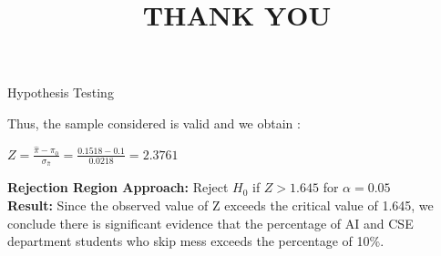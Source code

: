 \documentclass{beamer}
\begin{document}
\begin{frame}{Hypothesis Testing}
\begin{block}{}
Thus, the sample considered is valid and we obtain :
\begin{center}
$Z = \frac{\hat{\pi}-{\pi_0}}{\sigma_{\hat{\pi}}} = \frac{0.1518-0.1}{0.0218} = 2.3761$
\end{center}
\textbf{Rejection Region Approach:}
Reject $H_0$ if $Z>1.645$ for $\alpha = 0.05$\\
\textbf{Result:}
Since the observed value of Z exceeds the critical value of
1.645, we conclude there is significant evidence that the
percentage of AI and CSE department students who skip mess exceeds the percentage of 10\%.
\end{block}
\end{frame}


\title{THANK YOU}
\begin{frame}
 \titlepage
\end{frame}
\end{document}
